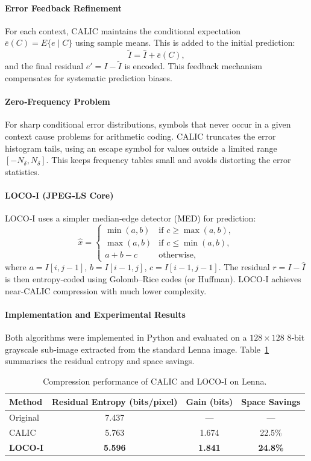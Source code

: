 \paragraph{Error Feedback Refinement}
For each context, CALIC maintains the conditional expectation \(\bar{e}(C) = E\{e \mid C\}\) using sample means. This is added to the initial prediction:
\[
\tilde{I} = \hat{I} + \bar{e}(C), 
\]
and the final residual \(e' = I - \tilde{I}\) is encoded. This feedback mechanism compensates for systematic prediction biases.

\paragraph{Zero‑Frequency Problem}
For sharp conditional error distributions, symbols that never occur in a given context cause problems for arithmetic coding. CALIC truncates the error histogram tails, using an escape symbol for values outside a limited range \([-N_\delta, N_\delta]\). This keeps frequency tables small and avoids distorting the error statistics.

\paragraph{LOCO‑I (JPEG‑LS Core)}
LOCO‑I uses a simpler median‑edge detector (MED) for prediction\cite{Weinberger1996}:
\[
\hat{x} = \begin{cases} 
\min(a,b) & \text{if } c \ge \max(a,b),\\
\max(a,b) & \text{if } c \le \min(a,b),\\
a + b - c & \text{otherwise},
\end{cases}
\]
where \(a = I[i,j-1]\), \(b = I[i-1,j]\), \(c = I[i-1,j-1]\). The residual \(r = I - \hat{I}\) is then entropy‑coded using Golomb–Rice codes (or Huffman). LOCO‑I achieves near‑CALIC compression with much lower complexity.

\paragraph{Implementation and Experimental Results}
Both algorithms were implemented in Python and evaluated on a \(128\times128\) 8‑bit grayscale sub‑image extracted from the standard Lenna image. Table~\ref{tab:calic_results} summarises the residual entropy and space savings.

\begin{table}[H]
\centering
\caption{Compression performance of CALIC and LOCO‑I on Lenna.}
\label{tab:calic_results}
\begin{tabular}{|l|c|c|c|}
\hline
\textbf{Method} & \textbf{Residual Entropy (bits/pixel)} & \textbf{Gain (bits)} & \textbf{Space Savings} \\
\hline
Original & 7.437 & — & — \\
CALIC & 5.763 & 1.674 & 22.5\% \\
\hline
\textbf{LOCO‑I} & \textbf{5.596} & \textbf{1.841} & \textbf{24.8\%} \\
\hline
\end{tabular}
\end{table}

